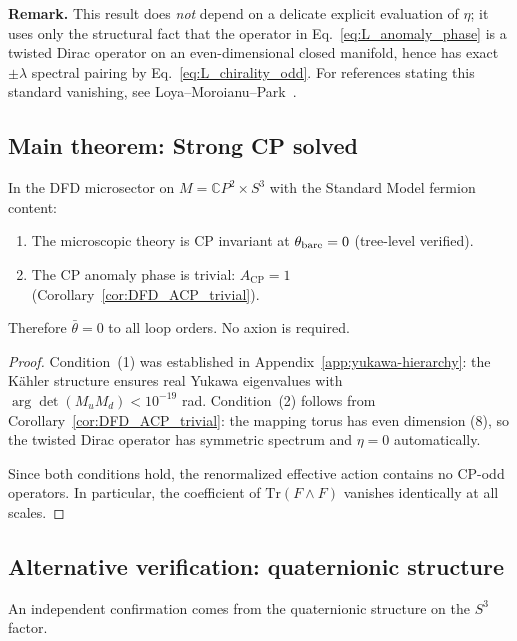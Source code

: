 \noindent\textbf{Remark.}
This result does \emph{not} depend on a delicate explicit evaluation of $\eta$;
it uses only the structural fact that the operator in Eq.~\eqref{eq:L_anomaly_phase} is a twisted Dirac operator on an even-dimensional closed manifold, hence has exact $\pm\lambda$ spectral pairing by Eq.~\eqref{eq:L_chirality_odd}.
For references stating this standard vanishing, see Loya--Moroianu--Park~\cite{LoyaMoroianuPark2009}.

\subsection{Main theorem: Strong CP solved}

\begin{theorem}\label{thm:strong_cp_all_loops}
In the DFD microsector on $M = \mathbb{C}P^2\times S^3$ with the Standard Model fermion content:
\begin{enumerate}
\item The microscopic theory is CP invariant at $\theta_{\rm bare}=0$ (tree-level verified).
\item The CP anomaly phase is trivial: $A_{\mathrm{CP}}=1$ (Corollary~\ref{cor:DFD_ACP_trivial}).
\end{enumerate}
Therefore $\bar\theta=0$ to all loop orders. No axion is required.
\end{theorem}

\begin{proof}
Condition~(1) was established in Appendix~\ref{app:yukawa-hierarchy}: the K\"ahler structure ensures real Yukawa eigenvalues with $\arg\det(M_u M_d) < 10^{-19}$ rad.
Condition~(2) follows from Corollary~\ref{cor:DFD_ACP_trivial}: the mapping torus has even dimension (8), so the twisted Dirac operator has symmetric spectrum and $\eta = 0$ automatically.

Since both conditions hold, the renormalized effective action contains no CP-odd operators.
In particular, the coefficient of $\mathrm{Tr}(F\wedge F)$ vanishes identically at all scales.
\end{proof}

\subsection{Alternative verification: quaternionic structure}

An independent confirmation comes from the quaternionic structure on the $S^3$ factor.

